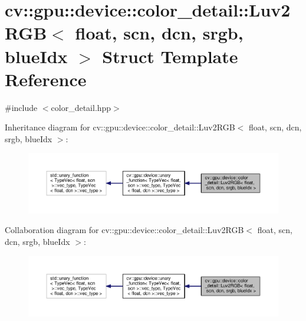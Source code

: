 \hypertarget{structcv_1_1gpu_1_1device_1_1color__detail_1_1Luv2RGB_3_01float_00_01scn_00_01dcn_00_01srgb_00_01blueIdx_01_4}{\section{cv\-:\-:gpu\-:\-:device\-:\-:color\-\_\-detail\-:\-:Luv2\-R\-G\-B$<$ float, scn, dcn, srgb, blue\-Idx $>$ Struct Template Reference}
\label{structcv_1_1gpu_1_1device_1_1color__detail_1_1Luv2RGB_3_01float_00_01scn_00_01dcn_00_01srgb_00_01blueIdx_01_4}
}


{\ttfamily \#include $<$color\-\_\-detail.\-hpp$>$}



Inheritance diagram for cv\-:\-:gpu\-:\-:device\-:\-:color\-\_\-detail\-:\-:Luv2\-R\-G\-B$<$ float, scn, dcn, srgb, blue\-Idx $>$\-:\nopagebreak
\begin{figure}[H]
\begin{center}
\leavevmode
\includegraphics[width=350pt]{structcv_1_1gpu_1_1device_1_1color__detail_1_1Luv2RGB_3_01float_00_01scn_00_01dcn_00_01srgb_00_01blueIdx_01_4__inherit__graph}
\end{center}
\end{figure}


Collaboration diagram for cv\-:\-:gpu\-:\-:device\-:\-:color\-\_\-detail\-:\-:Luv2\-R\-G\-B$<$ float, scn, dcn, srgb, blue\-Idx $>$\-:\nopagebreak
\begin{figure}[H]
\begin{center}
\leavevmode
\includegraphics[width=350pt]{structcv_1_1gpu_1_1device_1_1color__detail_1_1Luv2RGB_3_01float_00_01scn_00_01dcn_00_01srgb_00_01blueIdx_01_4__coll__graph}
\end{center}
\end{figure}
